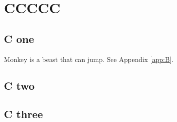 \chapter{CCCCC}\label{ch:C}
\section{C one}
Monkey is a beast that can jump. See Appendix \ref{app:B}.
\section{C two}
\section{C three}